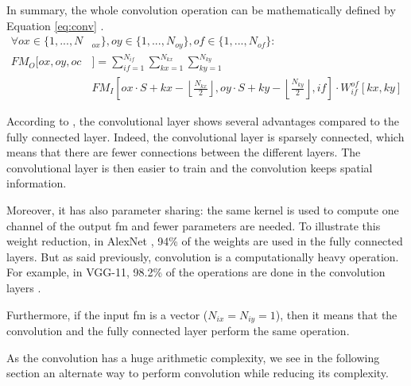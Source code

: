 In summary, the whole convolution operation can be mathematically defined by Equation \eqref{eq:conv} \cite{abdelouahab_accelerating_2018}.
%
{\small
\begin{equation}
    \begin{split}
        \forall ox \in \{ 1, ..., N&_{ox} \}, oy \in \{ 1, ..., N_{oy} \}, of \in \{ 1, ..., N_{of} \}: \\
        FM_O[ox, oy, oc&] = \sum^{N_{if}}_{if=1}
        \sum^{N_{kx}}_{kx=1}
        \sum^{N_{ky}}_{ky=1}\\
        & FM_I \left[ ox \cdot S + kx - \left\lfloor \frac{N_{kx}}{2} \right\rfloor,  oy \cdot S + ky - \left\lfloor \frac{N_{ky}}{2} \right\rfloor, if \right] \cdot
        W^{of}_{if} \left[ kx, ky \right]
    \end{split}
    \label{eq:conv}
\end{equation}
}

According to \textcite{goodfellow_deep_2016}, the convolutional layer shows several advantages compared to the fully connected layer. Indeed, the convolutional layer is sparsely connected, which means that there are fewer connections between the different layers. The convolutional layer is then easier to train and the convolution keeps spatial information. 

Moreover, it has also parameter sharing: the same kernel is used to compute one channel of the output \acrshort{fm} and fewer parameters are needed. To illustrate this weight reduction, in AlexNet \cite{krizhevsky_imagenet_2012}, 94\% of the weights are used in the fully connected layers. But as said previously, convolution is a computationally heavy operation. For example, in VGG-11, 98.2\% of the operations are done in the convolution layers \cite{guo_survey_2018}. 

Furthermore, if the input \acrshort{fm} is a vector ($N_{ix} = N_{iy} = 1$), then it means that the convolution and the fully connected layer perform the same operation.

As the convolution has a huge arithmetic complexity, we see in the following section an alternate way to perform convolution while reducing its complexity.
